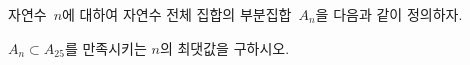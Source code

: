 자연수~$n$에 대하여 자연수 전체 집합의 부분집합~$A_n$을 다음과 같이 정의하자. \par\smallskip{}\par\smallskip\noindent $A_n\subset A_{25}$를 만족시키는 $n$의 최댓값을 구하시오.
